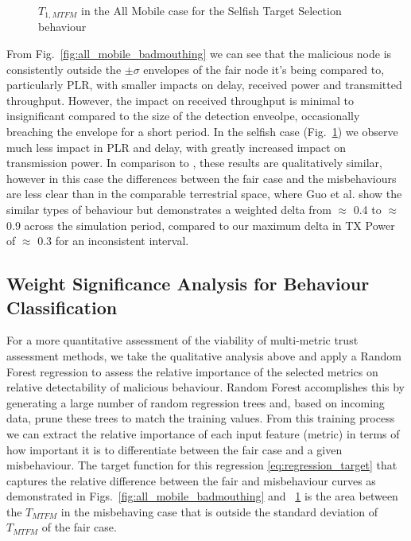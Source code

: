\documentclass[conference]{IEEEtran}
\begin{document}
\begin{figure}[h]
\caption{$T_{1,MTFM}$ in the All Mobile case for the Selfish Target Selection behaviour}
\label{fig:all_mobile_selfish}
\end{figure}

From Fig.~\ref{fig:all_mobile_badmouthing} we can see that the malicious node is consistently outside the $\pm\sigma$ envelopes of the fair node it's being compared to, particularly PLR, with smaller impacts on delay, received power and transmitted throughput. 
However, the impact on received throughput is minimal to insignificant compared to the size of the detection enveolpe, occasionally breaching the envelope for a short period. 
In the selfish case (Fig.~\ref{fig:all_mobile_selfish}) we observe much less impact in PLR and delay, with greatly increased impact on transmission power.
In comparison to \cite{Guo11}, these results are qualitatively similar, however in this case the differences between the fair case and the misbehaviours are less clear than in the comparable terrestrial space, where Guo et al. show the similar types of behaviour but demonstrates a weighted delta from $\approx$ 0.4 to $\approx$ 0.9 across the simulation period, compared to our maximum delta in TX Power of $\approx$ 0.3 for an inconsistent interval.


\subsection{Weight Significance Analysis for Behaviour Classification}

For a more quantitative assessment of the viability of multi-metric trust assessment methods, we take the qualitative analysis above and apply a Random Forest regression \cite{Breiman2001} to assess the relative importance of the selected metrics on relative detectability of malicious behaviour. 
Random Forest accomplishes this by generating a large number of random regression trees and, based on incoming data, prune these trees to match the training values.
From this training process we can extract the relative importance of each input feature (metric) in terms of how important it is to differentiate between the fair case and a given misbehaviour.
The target function for this regression \eqref{eq:regression_target} that captures the relative difference between the fair and misbehaviour curves as demonstrated in Figs.~\ref{fig:all_mobile_badmouthing} and ~\ref{fig:all_mobile_selfish} is the area between the $T_{MTFM}$ in the misbehaving case that is outside the standard deviation of $T_{MTFM}$ of the fair case.
\end{document}
